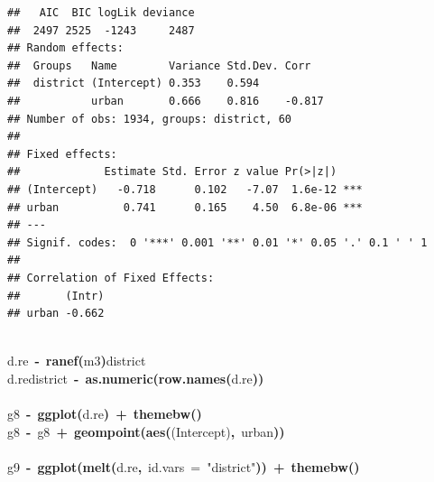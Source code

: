 \documentclass{article}
\makeatletter
\newcommand{\hlfunctioncall}[1]{\textcolor[rgb]{.5,0,.33}{\textbf{#1}}}%
\newcommand{\hlstring}[1]{\textcolor[rgb]{.6,.6,1}{#1}}%
\newcommand{\hlkeyword}[1]{\textbf{#1}}%
\newcommand{\hlargument}[1]{\textcolor[rgb]{.69,.25,.02}{#1}}%
\newcommand{\hlassignement}[1]{\textbf{#1}}%
\newcommand{\hlsymbol}[1]{#1}%
\newcommand{\hlstd}[1]{\textcolor[rgb]{0,0,0}{#1}}%
\newenvironment{kframe}{%
 \def\FrameCommand##1{\hskip\@totalleftmargin \hskip-\fboxsep
 \colorbox{shadecolor}{##1}\hskip-\fboxsep
     \hskip-\linewidth \hskip-\@totalleftmargin \hskip\columnwidth}%
 \MakeFramed {\advance\hsize-\width
   \@totalleftmargin\z@ \linewidth\hsize
   \@setminipage}}%
 {\par\unskip\endMakeFramed}
\newenvironment{knitrout}{}{} %
\makeatother
\begin{document}
\begin{knitrout}
{\begin{kframe}
\begin{verbatim}
##   AIC  BIC logLik deviance
##  2497 2525  -1243     2487
## Random effects:
##  Groups   Name        Variance Std.Dev. Corr   
##  district (Intercept) 0.353    0.594           
##           urban       0.666    0.816    -0.817 
## Number of obs: 1934, groups: district, 60
## 
## Fixed effects:
##             Estimate Std. Error z value Pr(>|z|)    
## (Intercept)   -0.718      0.102   -7.07  1.6e-12 ***
## urban          0.741      0.165    4.50  6.8e-06 ***
## ---
## Signif. codes:  0 '***' 0.001 '**' 0.01 '*' 0.05 '.' 0.1 ' ' 1 
## 
## Correlation of Fixed Effects:
##       (Intr)
## urban -0.662
\end{verbatim}
\begin{flushleft}
\ttfamily\noindent
\hspace*{\fill}\\
\hlstd{}\hlsymbol{d.re}{\ }\hlassignement{\usebox{\hlnormalsizeboxlessthan}-}{\ }\hlfunctioncall{ranef}\hlkeyword{(}\hlsymbol{m3}\hlkeyword{)}\hlkeyword{\usebox{\hlnormalsizeboxdollar}}\hlsymbol{district}\hspace*{\fill}\\
\hlstd{}\hlsymbol{d.re}\hlkeyword{\usebox{\hlnormalsizeboxdollar}}\hlsymbol{district}{\ }\hlassignement{\usebox{\hlnormalsizeboxlessthan}-}{\ }\hlfunctioncall{as.numeric}\hlkeyword{(}\hlfunctioncall{row.names}\hlkeyword{(}\hlsymbol{d.re}\hlkeyword{)}\hlkeyword{)}\hspace*{\fill}\\
\hlstd{}\hspace*{\fill}\\
\hlstd{}\hlsymbol{g8}{\ }\hlassignement{\usebox{\hlnormalsizeboxlessthan}-}{\ }\hlfunctioncall{ggplot}\hlkeyword{(}\hlsymbol{d.re}\hlkeyword{)}{\ }\hlkeyword{+}{\ }\hlfunctioncall{theme\usebox{\hlnormalsizeboxunderscore}bw}\hlkeyword{(}\hlkeyword{)}\hspace*{\fill}\\
\hlstd{}\hlsymbol{g8}{\ }\hlassignement{\usebox{\hlnormalsizeboxlessthan}-}{\ }\hlsymbol{g8}{\ }\hlkeyword{+}{\ }\hlfunctioncall{geom\usebox{\hlnormalsizeboxunderscore}point}\hlkeyword{(}\hlfunctioncall{aes}\hlkeyword{(}\hlsymbol{\usebox{\hlnormalsizeboxbacktick}(Intercept)\usebox{\hlnormalsizeboxbacktick}}\hlkeyword{,}{\ }\hlsymbol{urban}\hlkeyword{)}\hlkeyword{)}\hspace*{\fill}\\
\hlstd{}\hspace*{\fill}\\
\hlstd{}\hlsymbol{g9}{\ }\hlassignement{\usebox{\hlnormalsizeboxlessthan}-}{\ }\hlfunctioncall{ggplot}\hlkeyword{(}\hlfunctioncall{melt}\hlkeyword{(}\hlsymbol{d.re}\hlkeyword{,}{\ }\hlargument{id.vars}{\ }\hlargument{=}{\ }\hlstring{"{}district"{}}\hlkeyword{)}\hlkeyword{)}{\ }\hlkeyword{+}{\ }\hlfunctioncall{theme\usebox{\hlnormalsizeboxunderscore}bw}\hlkeyword{(}\hlkeyword{)}\hspace*{\fill}\\

\end{flushleft}
\end{kframe}}
\end{knitrout}
\end{document}
